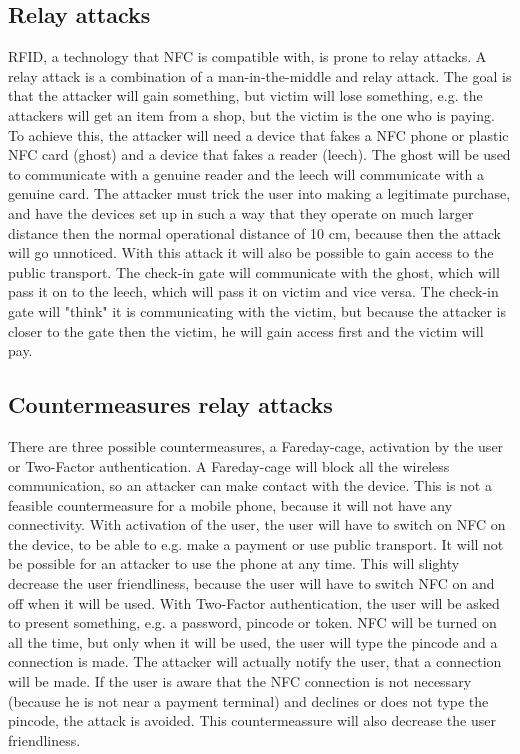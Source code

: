 \subsection{Relay attacks}
RFID, a technology that NFC is compatible with, is prone to relay attacks. A relay attack is a combination of a man-in-the-middle and relay attack. The goal is that the attacker will gain something, but victim will lose something, e.g. the attackers will get an item from a shop, but the victim is the one who is paying. 
To achieve this, the attacker will need a device that fakes a NFC phone or plastic NFC card (ghost) and a device that fakes a reader (leech). The ghost will be used to communicate with a genuine reader and the leech will communicate with a genuine card. The attacker must trick the user into making a legitimate purchase, and have the devices set up in such a way that they operate on much larger distance then the normal operational distance of 10 cm, because then the attack will go unnoticed. \cite{1128470}
With this attack it will also be possible to gain access to the public transport. The check-in gate will communicate with the ghost, which will pass it on to the leech, which will pass it on victim and vice versa. The check-in gate will "think" it is communicating with the victim, but because the attacker is closer to the gate then the victim, he will gain access first and the victim will pay.

\subsection{Countermeasures relay attacks}
There are three possible countermeasures, a Fareday-cage, activation by the user or Two-Factor authentication. A Fareday-cage will block all the wireless communication, so an attacker can make contact with the device. This is not a feasible countermeasure for a mobile phone, because it will not have any connectivity.
With activation of the user, the user will have to switch on NFC on the device, to be able to e.g. make a payment or use public transport. It will not be possible for an attacker to use the phone at any time. This will slighty decrease the user friendliness, because the user will have to switch NFC on and off when it will be used.
With Two-Factor authentication, the user will be asked to present something, e.g. a password, pincode or token. NFC will be turned on all the time, but only when it will be used, the user will type the pincode and a connection is made. The attacker will actually notify the user, that a connection will be made. If the user is aware that the NFC connection is not necessary (because he is not near a payment terminal) and declines or does not type the pincode, the attack is avoided. This countermeassure will also decrease the user friendliness. \cite{1128470}

